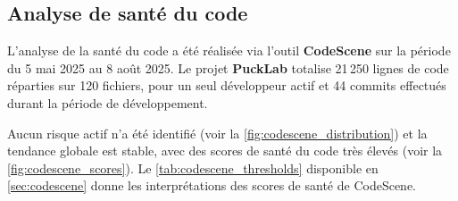 \subsection{Analyse de santé du code}
L'analyse de la santé du code a été réalisée via l'outil \textbf{CodeScene} sur la période du 5 mai 2025 au 8 août 2025. 
Le projet \textbf{PuckLab} totalise 21\,250 lignes de code réparties sur 120 fichiers, pour un seul développeur actif et 44 commits effectués durant la période de développement.

Aucun risque actif n’a été identifié (voir la \autoref{fig:codescene_distribution}) et la tendance globale est stable, avec des scores de santé du code très élevés (voir la \autoref{fig:codescene_scores}).
Le \autoref{tab:codescene_thresholds} disponible en \autoref{sec:codescene} donne les interprétations des scores de santé de CodeScene.

